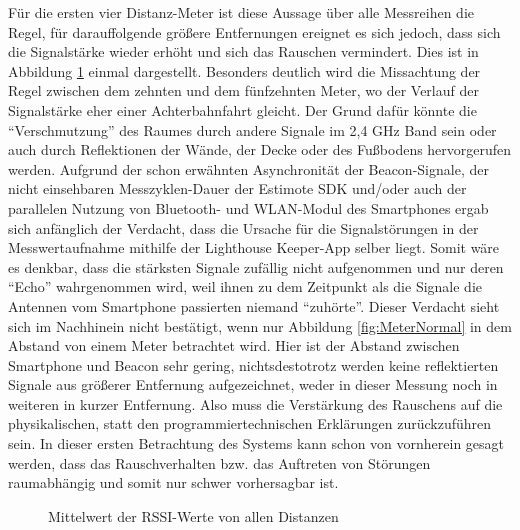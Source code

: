 Für die ersten vier Distanz-Meter ist diese Aussage über alle Messreihen die Regel, für darauffolgende größere Entfernungen ereignet es sich jedoch, dass sich die Signalstärke wieder erhöht und sich das Rauschen vermindert. Dies ist in Abbildung  \ref{fig:MittelwertAlle} einmal dargestellt. Besonders deutlich wird die Missachtung der Regel zwischen dem zehnten und dem fünfzehnten Meter, wo der Verlauf der Signalstärke eher einer Achterbahnfahrt gleicht. Der Grund dafür könnte die "`Verschmutzung"' des Raumes durch andere Signale im 2,4 GHz Band sein oder auch durch Reflektionen der Wände, der Decke oder des Fußbodens hervorgerufen werden. Aufgrund der schon erwähnten Asynchronität der Beacon-Signale, der nicht einsehbaren Messzyklen-Dauer der Estimote SDK und/oder auch der parallelen Nutzung von Bluetooth- und WLAN-Modul des Smartphones ergab sich anfänglich der Verdacht, dass die Ursache für die Signalstörungen in der Messwertaufnahme mithilfe der Lighthouse Keeper-App selber liegt. Somit wäre es denkbar, dass die stärksten Signale zufällig nicht aufgenommen und nur deren "`Echo"' wahrgenommen wird, weil ihnen zu dem Zeitpunkt als die Signale die Antennen vom Smartphone passierten niemand "`zuhörte"'. Dieser Verdacht sieht sich im Nachhinein nicht bestätigt, wenn nur Abbildung \ref{fig:MeterNormal} in dem Abstand von einem Meter betrachtet wird. Hier ist der Abstand zwischen Smartphone und Beacon sehr gering, nichtsdestotrotz werden keine reflektierten Signale aus größerer Entfernung aufgezeichnet, weder in dieser Messung noch in weiteren in kurzer Entfernung. Also muss die Verstärkung des Rauschens auf die physikalischen, statt den programmiertechnischen Erklärungen zurückzuführen sein. In dieser ersten Betrachtung des Systems kann schon von vornherein gesagt werden, dass das Rauschverhalten bzw. das Auftreten von Störungen raumabhängig und somit nur schwer vorhersagbar ist.
\begin{figure}[H] 
\centering
{}
\caption{Mittelwert der RSSI-Werte von allen Distanzen}
\label{fig:MittelwertAlle}
\end{figure}
